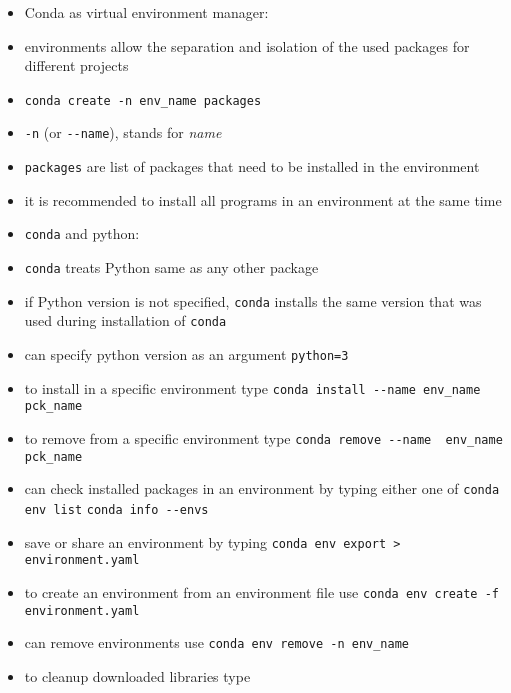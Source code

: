 \documentclass[onecolumn]{IEEEtran} %
\begin{document}
\begin{itemize}
    \ei
    \item Conda as virtual environment manager:
    \bi
        \item environments allow the separation and isolation of the used packages for different projects
        \item \verb|conda create -n env_name packages|
        \bi
            \item \verb|-n| (or \verb|--name|), stands for \emph{name}
            \item \verb|packages| are list of packages that need to be installed in the environment
             \item it is recommended to install all programs in an environment at the same time
        \ei
        \item \verb|conda| and python:
        \bi
            \item \verb|conda| treats Python same as any other package
            \item if Python version is not specified, \verb|conda| installs the same version that was used during installation of \verb|conda|
            \item can specify python version as an argument \newline \verb|python=3|
        \ei
        \item to install in a specific environment type \newline \verb|conda install --name env_name pck_name|
        \item to remove from a specific environment type \newline \verb|conda remove --name  env_name pck_name|
        \item can check installed packages in an environment by typing either one of \newline
        \verb|conda env list| \newline
        \verb|conda info --envs|
        \item save or share an environment by typing \newline
        \verb|conda env export > environment.yaml|
        \item to create an environment from an environment file use \newline
        \verb|conda env create -f environment.yaml|
        \item can remove environments use \newline
        \verb|conda env remove -n env_name|
        \item to cleanup downloaded libraries type

\end{itemize}
\end{document}

